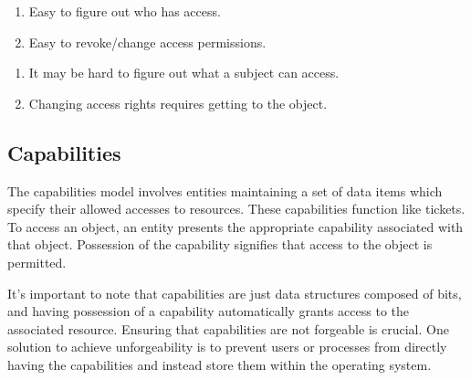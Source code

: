 \documentclass{report}
\begin{document}
\begin{tcbraster}[raster columns=2, raster equal height, raster force size=false]
  \begin{tcolorbox}[colback=green!5!white,colframe=black!75!green,title=Advantages]
    \begin{enumerate}[label=\textit{(\roman*)}]
      \item Easy to figure out who has access.
      \item Easy to revoke/change access permissions.
    \end{enumerate}
  \end{tcolorbox}
  \begin{tcolorbox}[colback=red!5!white,colframe=black!40!red,title=Disadvantages]
    \begin{enumerate}[label=\textit{(\roman*)}]
    \item It may be hard to figure out what a subject can access.
    \item Changing access rights requires getting to the object.
    \end{enumerate}
  \end{tcolorbox}
\end{tcbraster}


\subsection{Capabilities}
The capabilities model involves entities maintaining a set of data items which specify their allowed
accesses to resources. These capabilities function like tickets. To access an object, an entity
presents the appropriate capability associated with that object. Possession of the capability
signifies that access to the object is permitted.

It's important to note that capabilities are just data structures composed of bits, and having
possession of a capability automatically grants access to the associated resource. Ensuring that
capabilities are not forgeable is crucial. One solution to achieve unforgeability is to prevent
users or processes from directly having the capabilities and instead store them within the operating
system.
\end{document}
